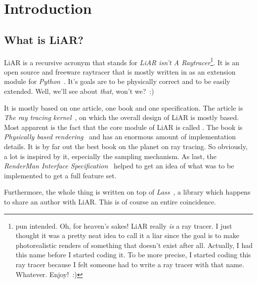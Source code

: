 % 

\chapter{Introduction}

\section{What is LiAR?}

LiAR is a recursive acronym that stands for \emph{LiAR isn't A Raytracer}\footnote{pun intended. Oh, for heaven's sakes! LiAR really \emph{is} a ray tracer.  I just thought it was a pretty neat idea to call it a liar since the goal is to make photorealistic renders of something that doesn't exist after all.  Actually, I had this name before I started coding it.  To be more precise, I started coding this ray tracer because I felt someone had to write a ray tracer with that name.  Whatever.  Enjoy!~:)}.  It is an open source and freeware raytracer that is mostly written in \Cpp  as an extension module for \emph{Python}~\cite{Python}.  It's goals are to be physically correct and to be easily extended.  Well, we'll see about \emph{that}, won't we?~:)

It is mostly based on one article, one book and one specification.  The article is \emph{The ray tracing kernel}~\cite{kirk88ray}, on which the overall design of LiAR is mostly based.  Most apparent is the fact that the core module of LiAR is called .  The book is \emph{Physically based rendering}~\cite{Pharr2004pbrt} and has an enormous amount of implementation details. It is by far out the best book on the planet on ray tracing.  So obviously, a lot is inspired by it, especially the sampling mechanism.  As last, the \emph{RenderMan Interface Specification}~\cite{RISpec} helped to get an idea of what was to be implemented to get a full feature set.  

Furthermore, the whole thing is written on top of \emph{Lass}~\cite{Lass}, a \Cpp library which happens to share an author with LiAR.  This is of course an entire coincidence.

